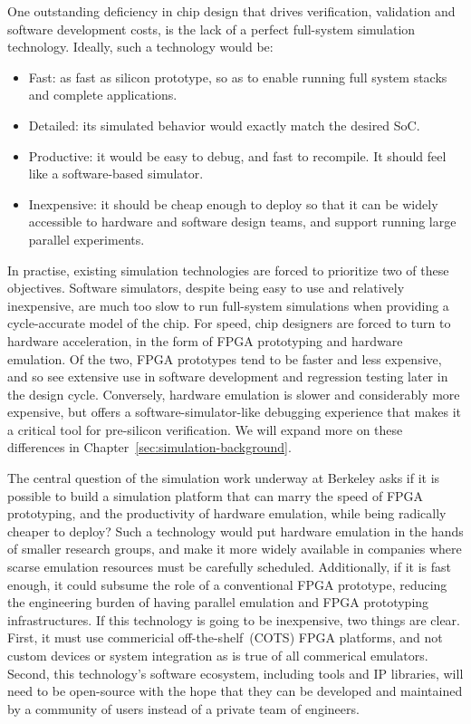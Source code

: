One outstanding deficiency in chip design that drives verification, validation and software development
costs, is the lack of a perfect full-system simulation technology. Ideally, such
a technology would be:
\begin{itemize}
    \item Fast: as fast as silicon prototype, so as to enable running full system
    stacks and complete applications.
    \item Detailed: its simulated behavior would exactly match the desired SoC.
    \item Productive: it would be easy to debug, and fast to recompile.  It should feel like a software-based simulator.
    \item Inexpensive: it should be cheap enough to deploy so that it can be widely accessible
        to hardware and software design teams, and support running large parallel experiments.
\end{itemize}

In practise, existing simulation technologies are forced to prioritize two of
these objectives. Software simulators, despite being easy to use and relatively
inexpensive, are much too slow to run full-system simulations when providing a
cycle-accurate model of the chip. For speed, chip designers are forced to turn
to hardware acceleration, in the form of FPGA prototyping and hardware
emulation.  Of the two, FPGA prototypes tend to be faster and less expensive,
and so see extensive use in software development and regression testing later
in the design cycle.  Conversely, hardware emulation is slower and considerably
more expensive, but offers a software-simulator-like debugging experience that
makes it a critical tool for pre-silicon verification. We will expand more on these
differences in Chapter~\ref{sec:simulation-background}.

The central question of the simulation work underway at Berkeley asks if it is
possible to build a simulation platform that can marry the speed of FPGA
prototyping, and the productivity of hardware emulation, while being radically
cheaper to deploy? Such a technology would put hardware emulation in the hands
of smaller research groups, and make it more widely available in companies
where scarse emulation resources must be carefully scheduled. Additionally, if
it is fast enough, it could subsume the role of a conventional FPGA prototype,
reducing the engineering burden of having parallel emulation and FPGA
prototyping infrastructures. If this technology is going to be inexpensive, two
things are clear.  First, it must use commericial off-the-shelf~(COTS) FPGA
platforms, and not custom devices or system integration as is true of all
commerical emulators. Second, this technology's software ecosystem, including
tools and IP libraries, will need to be open-source with the hope that they can
be developed and maintained by a community of users instead of a private team
of engineers.

